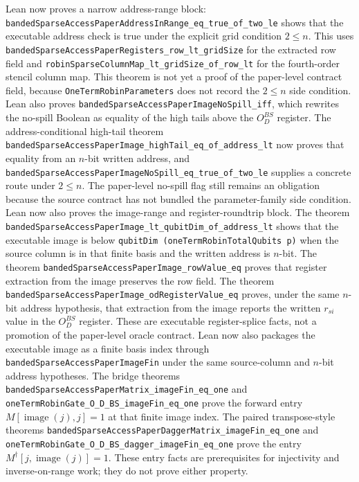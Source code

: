 Lean now proves a narrow address-range block:
\texttt{bandedSparseAccessPaperAddressInRange\_eq\_true\_of\_two\_le}
shows that the executable address check is true under the explicit grid
condition $2 \le n$.  This uses
\texttt{bandedSparseAccessPaperRegisters\_row\_lt\_gridSize} for the extracted
row field and
\texttt{robinSparseColumnMap\_lt\_gridSize\_of\_row\_lt} for the fourth-order
stencil column map.  This theorem is not yet a proof of the paper-level
contract field, because \texttt{OneTermRobinParameters} does not record the
$2 \le n$ side condition.  Lean also proves
\texttt{bandedSparseAccessPaperImageNoSpill\_iff}, which rewrites the no-spill
Boolean as equality of the high tails above the $O_D^{BS}$ register.  The
address-conditional high-tail theorem
\texttt{bandedSparseAccessPaperImage\_highTail\_eq\_of\_address\_lt} now proves
that equality from an $n$-bit written address, and
\texttt{bandedSparseAccessPaperImageNoSpill\_eq\_true\_of\_two\_le} supplies a
concrete route under $2 \le n$.  The paper-level no-spill flag still remains an
obligation because the source contract has not bundled the parameter-family
side condition.  Lean now also proves the image-range and register-roundtrip
block.  The theorem
\texttt{bandedSparseAccessPaperImage\_lt\_qubitDim\_of\_address\_lt} shows that
the executable image is below
\texttt{qubitDim (oneTermRobinTotalQubits p)} when the source column is in that
finite basis and the written address is $n$-bit.  The theorem
\texttt{bandedSparseAccessPaperImage\_rowValue\_eq} proves that register
extraction from the image preserves the row field.  The theorem
\texttt{bandedSparseAccessPaperImage\_odRegisterValue\_eq} proves, under the
same $n$-bit address hypothesis, that extraction from the image reports the
written $r_{si}$ value in the $O_D^{BS}$ register.  These are executable
register-splice facts, not a promotion of the paper-level oracle contract.
Lean now also packages the executable image as a finite basis index through
\texttt{bandedSparseAccessPaperImageFin} under the same source-column and
$n$-bit address hypotheses.  The bridge theorems
\texttt{bandedSparseAccessPaperMatrix\_imageFin\_eq\_one} and
\texttt{oneTermRobinGate\_O\_D\_BS\_imageFin\_eq\_one} prove the forward entry
$M[\operatorname{image}(j),j]=1$ at that finite image index.  The paired
transpose-style theorems
\texttt{bandedSparseAccessPaperDaggerMatrix\_imageFin\_eq\_one} and
\texttt{oneTermRobinGate\_O\_D\_BS\_dagger\_imageFin\_eq\_one} prove the entry
$M^\dagger[j,\operatorname{image}(j)]=1$.  These entry facts are prerequisites
for injectivity and inverse-on-range work; they do not prove either property.
